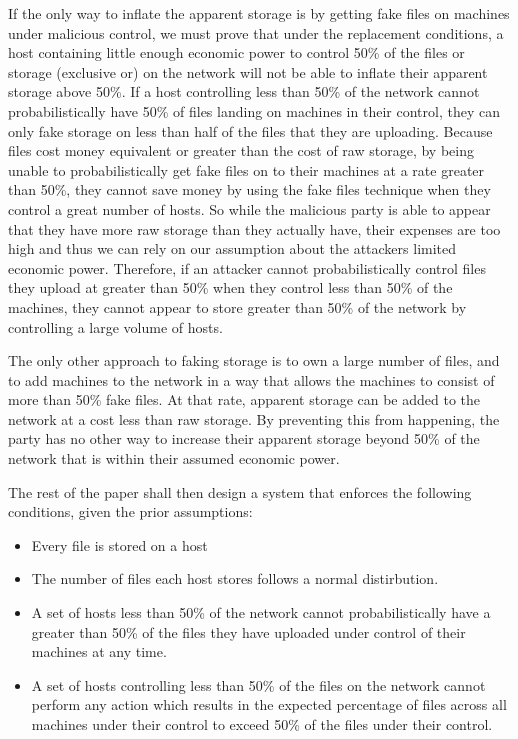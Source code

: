 \documentclass[twocolumn]{article}
\begin{document}
If the only way to inflate the apparent storage is by getting fake files on machines under malicious control, we must prove that under the replacement conditions, a host containing little enough economic power to control 50\% of the files or storage (exclusive or) on the network will not be able to inflate their apparent storage above 50\%.
If a host controlling less than 50\% of the network cannot probabilistically have 50\% of files landing on machines in their control, they can only fake storage on less than half of the files that they are uploading.
Because files cost money equivalent or greater than the cost of raw storage, by being unable to probabilistically get fake files on to their machines at a rate greater than 50\%, they cannot save money by using the fake files technique when they control a great number of hosts.
So while the malicious party is able to appear that they have more raw storage than they actually have, their expenses are too high and thus we can rely on our assumption about the attackers limited economic power.
Therefore, if an attacker cannot probabilistically control files they upload at greater than 50\% when they control less than 50\% of the machines, they cannot appear to store greater than 50\% of the network by controlling a large volume of hosts.

The only other approach to faking storage is to own a large number of files, and to add machines to the network in a way that allows the machines to consist of more than 50\% fake files.
At that rate, apparent storage can be added to the network at a cost less than raw storage.
By preventing this from happening, the party has no other way to increase their apparent storage beyond 50\% of the network that is within their assumed economic power.

The rest of the paper shall then design a system that enforces the following conditions, given the prior assumptions:
\begin{itemize}
	\item Every file is stored on a host
	\item The number of files each host stores follows a normal distirbution.
	\item A set of hosts less than 50\% of the network cannot probabilistically have a greater than 50\% of the files they have uploaded under control of their machines at any time.
	\item A set of hosts controlling less than 50\% of the files on the network cannot perform any action which results in the expected percentage of files across all machines under their control to exceed 50\% of the files under their control.
\end{itemize}
\end{document}
